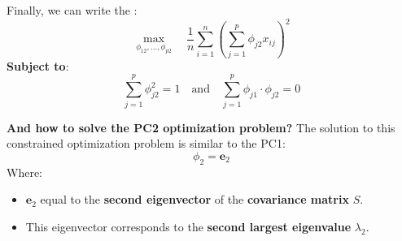 Finally, we can write the :
\begin{equation}
    \max_{\phi_{12}, \dots, \phi_{p2}} \quad \frac{1}{n} \sum_{i=1}^{n} \left( \sum_{j=1}^{p} \phi_{j2} x_{ij} \right)^2
\end{equation}
\textbf{Subject to}:
\begin{equation}
    \sum_{j=1}^{p} \phi_{j2}^2 = 1 \quad \text{and} \quad \sum_{j=1}^{p} \phi_{j1} \cdot \phi_{j2} = 0
\end{equation}

\highspace
\textcolor{Green3}{ \textbf{And how to solve the PC2 optimization problem?}}
The solution to this constrained optimization problem is similar to the PC1:
\begin{equation}
    \phi_{2} = \mathbf{e}_{2}
\end{equation}
Where:
\begin{itemize}
    \item $\mathbf{e}_{2}$ equal to the \textbf{second eigenvector} of the \textbf{covariance matrix} $S$.
    \item This eigenvector corresponds to the \textbf{second largest eigenvalue} $\lambda_{2}$.
\end{itemize}